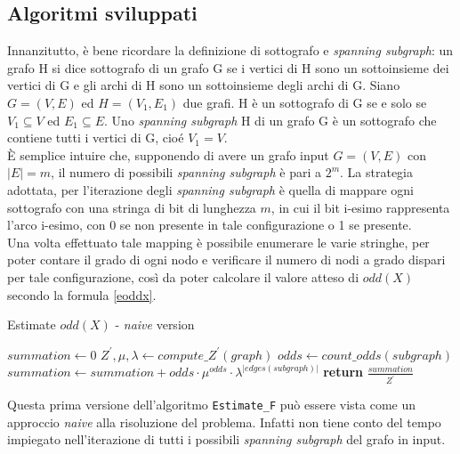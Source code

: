 \subsection{Algoritmi sviluppati}\label{ssec:algooddx}
Innanzitutto, è bene ricordare la definizione di sottografo e \textit{spanning subgraph}: un grafo H si dice sottografo di un grafo G se i vertici di H sono un sottoinsieme dei vertici di G e gli archi di H sono un sottoinsieme degli archi di G. Siano $G=(V, E)$ ed $H=(V_1, E_1)$ due grafi. H è un sottografo di G se e solo se $V_1 \subseteq V$ ed $E_1 \subseteq E$. Uno \textit{spanning subgraph} H di un grafo G è un sottografo che contiene tutti i vertici di G, cioé $V_1 = V$.\\
È semplice intuire che, supponendo di avere un grafo input $G = (V, E)$ con $|E| = m$, il numero di possibili \textit{spanning subgraph} è pari a $2^m$.
La strategia adottata, per l'iterazione degli \textit{spanning subgraph} è quella di mappare ogni sottografo con una stringa di bit di lunghezza $m$, in cui il bit i-esimo rappresenta l'arco i-esimo, con 0 se non presente in tale configurazione o 1 se presente.\\
Una volta effettuato tale mapping è possibile enumerare le varie stringhe, per poter contare il grado di ogni nodo e verificare il numero di nodi a grado dispari per tale configurazione, così da poter calcolare il valore atteso di $odd(X)$ secondo la formula \ref{eoddx}.\\
\begin{algorithm}
	\caption{Estimate $odd(X)$ - \textit{naive} version}
	\label{alg:est_f_naive}
	\begin{algorithmic}[1] %
		\State $summation\gets 0$
		\State $Z^{\prime}, \mu, \lambda \gets compute\_Z^\prime(graph)$
			\State $odds \gets count\_odds(subgraph)$ 
			\State $summation \gets summation + odds \cdot \mu^{odds} \cdot \lambda^{|edges(subgraph)|}$
		\EndFor
		\State \textbf{return} $\frac{summation}{Z^{\prime}}$
		\EndProcedure
	\end{algorithmic}
\end{algorithm}
Questa prima versione dell'algoritmo \texttt{Estimate\_F} può essere vista come un approccio \textit{naive} alla risoluzione del problema. Infatti non tiene conto del tempo impiegato nell'iterazione di tutti i possibili \textit{spanning subgraph} del grafo in input.\\
